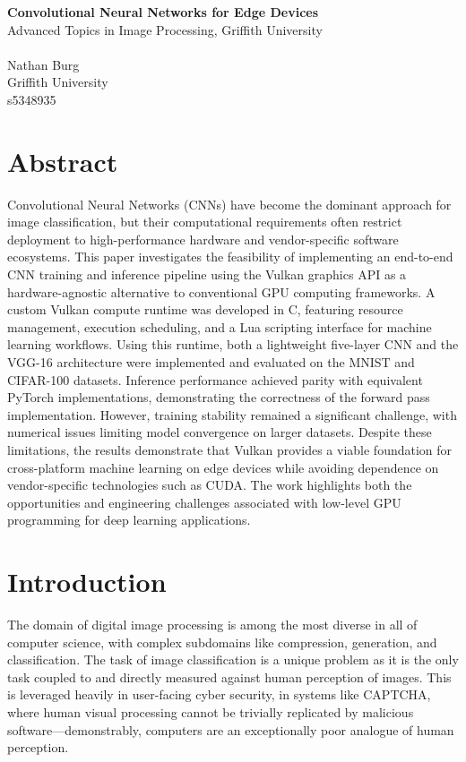 \documentclass[10pt, a4paper]{article}
\begin{document}
{\noindent\LARGE\textbf{Convolutional Neural Networks for Edge Devices}}\\[0.1cm]
{\noindent\large Advanced Topics in Image Processing, Griffith University}\\
\\
{\noindent\large Nathan Burg\\Griffith University\\s5348935}\\

\section*{Abstract}
Convolutional Neural Networks (CNNs) have become the dominant approach for image classification, but their computational requirements often restrict deployment to high-performance hardware and vendor-specific software ecosystems. This paper investigates the feasibility of implementing an end-to-end CNN training and inference pipeline using the Vulkan graphics API as a hardware-agnostic alternative to conventional GPU computing frameworks. A custom Vulkan compute runtime was developed in C, featuring resource management, execution scheduling, and a Lua scripting interface for machine learning workflows. Using this runtime, both a lightweight five-layer CNN and the VGG-16 architecture were implemented and evaluated on the MNIST and CIFAR-100 datasets. Inference performance achieved parity with equivalent PyTorch implementations, demonstrating the correctness of the forward pass implementation. However, training stability remained a significant challenge, with numerical issues limiting model convergence on larger datasets. Despite these limitations, the results demonstrate that Vulkan provides a viable foundation for cross-platform machine learning on edge devices while avoiding dependence on vendor-specific technologies such as CUDA. The work highlights both the opportunities and engineering challenges associated with low-level GPU programming for deep learning applications.

\section{Introduction}
The domain of digital image processing is among the most diverse in all of computer science, with complex subdomains like compression, generation, and classification. The task of image classification is a unique problem as it is the only task coupled to and directly measured against human perception of images. This is leveraged heavily in user-facing cyber security, in systems like CAPTCHA, where human visual processing cannot be trivially replicated by malicious software\cite{goos_captcha_2003}---demonstrably, computers are an exceptionally poor analogue of human perception.
\end{document}
